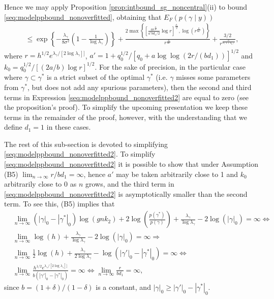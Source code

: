 Hence we may apply Proposition \ref{prop:intbound_sg_noncentral}(ii) to bound \eqref{seq:modelppbound_nonoverfitted}, obtaining that $ E_F (p(\gamma \mid y))$
\begin{align}
 \leq  
 \exp \left\{ -\frac{\lambda_\gamma}{8\sigma^2} \left( 1 - \frac{1}{\log \lambda_\gamma} \right)\right\} +
\frac{2 \max \left\{ \left[ \frac{a e^{\frac{q_0}{a'}}}{a'b d_1/2} \log r \right]^{\frac{d_1}{2}} , \log \left( r^{\frac{a}{b a'}} \right)  \right\}}{r^{\frac{a}{b a'}}}
+ \frac{3/2}{r^{\frac{a}{b (1+k_0)}}},
\label{seq:modelppbound_nonoverfitted2}
\end{align}
where $r=h^{1/2} e^{\lambda_\gamma/[2 \log \lambda_\gamma]]}$,
 $a'= 1 + q_0^{1/2}/[q_0 + a \log \log (2r / (b d_1))]^{1/2}$ and
$k_0= q_0^{1/2}/[(2 a/b) \log r]^{1/2}$.
For the sake of precision, in the particular case where $\gamma \subset \gamma^*$ is a strict subset of the optimal $\gamma^*$ (i.e. $\gamma$ misses some parameters from $\gamma^*$, but does not add any spurious parameters), then the second and third terms in Expression \eqref{seq:modelppbound_nonoverfitted2} are equal to zero (see the proposition's proof). To simplify the upcoming presentation we keep these terms in the remainder of the proof, however, with the understanding that we define $d_1=1$ in these cases.

The rest of this sub-section is devoted to simplifying \eqref{seq:modelppbound_nonoverfitted2}.
To simplify \eqref{seq:modelppbound_nonoverfitted2} it is possible to show that under Assumption (B5)  $\lim_{n \rightarrow \infty} r/bd_1= \infty$, hence $a'$ may be taken arbitrarily close to 1 and $k_0$ arbitrarily close to 0 as $n$ grows, and the third term in \eqref{seq:modelppbound_nonoverfitted2} is asymptotically smaller than the second term. 
To see this, (B5) implies that
\begin{align}
&\lim_{n \rightarrow \infty} (|\gamma|_0 - |\gamma^*|_0) \log(gnk_2) + 2 \log \left( \frac{p(\gamma^*)}{p(\gamma)} \right) + \frac{\lambda_\gamma}{\log \lambda_\gamma} - 2 \log(|\gamma|_0)= \infty \Leftrightarrow
\nonumber \\
&\lim_{n \rightarrow \infty} \log(h) + \frac{\lambda_\gamma}{\log \lambda_\gamma} - 2 \log(|\gamma|_0)= \infty
\Rightarrow
\nonumber \\
&\lim_{n \rightarrow \infty} \frac{1}{2}\log(h) + \frac{\lambda_\gamma}{2\log \lambda_\gamma} - \log(|\gamma'|_0 - |\gamma^*|_0)= \infty
\Leftrightarrow
\nonumber \\
&\lim_{n \rightarrow \infty} \frac{h^{1/2} e^{\lambda_\gamma/[2 \log \lambda_\gamma]]}}{b (|\gamma'|_0 - |\gamma^*|_0)}= \infty 
\Leftrightarrow \lim_{n \rightarrow \infty} \frac{r}{bd_1}= \infty,
\nonumber
\end{align}
since $b=(1+\delta)/(1-\delta)$ is a constant, and $|\gamma|_0 \geq |\gamma'|_0 - |\gamma^*|_0$.

